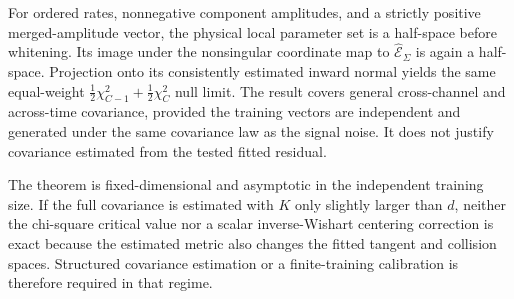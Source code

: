 For ordered rates, nonnegative component amplitudes, and a strictly positive
merged-amplitude vector, the physical local parameter set is a half-space
before whitening. Its image under the
nonsingular coordinate map to $\widehat{\mathcal E}_\Sigma$ is again a
half-space.  Projection onto its consistently estimated inward normal yields
the same equal-weight
$\frac12\chi^2_{C-1}+\frac12\chi^2_C$ null limit.  The result covers general
cross-channel and across-time covariance, provided the training vectors are
independent and generated under the same covariance law as the signal noise.
It does not justify covariance estimated from the tested fitted residual.

The theorem is fixed-dimensional and asymptotic in the independent training
size.  If the full covariance is estimated with $K$ only slightly larger than
$d$, neither the chi-square critical value nor a scalar inverse-Wishart
centering correction is exact because the estimated metric also changes the
fitted tangent and collision spaces.  Structured covariance estimation or a
finite-training calibration is therefore required in that regime.
